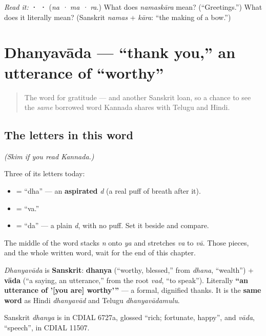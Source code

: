 \begin{tcolorbox}[breakable,colback=teal!4,colframe=teal!35!black,title={Before you move on}]
\emph{Read it:} \textbf{ ·  · } (\emph{na · ma · ra}.) What does \emph{namaskāra} mean? (“Greetings.”) What does it literally mean? (Sanskrit \emph{namas} + \emph{kāra}: “the making of a bow.”)
\end{tcolorbox}
\section[\texorpdfstring{\kn{ಧನ್ಯವಾದ} (dhanyavāda)}{ಧನ್ಯವಾದ (dhanyavāda)}]{Dhanyavāda — \textquotedblleft{}thank you,\textquotedblright{} an utterance of \textquotedblleft{}worthy\textquotedblright{}}

\label{lesson:KA-C01-dhanyavada}



\begin{quote}
The word for gratitude — and another Sanskrit loan, so a chance to see the \emph{same} borrowed word Kannada shares with Telugu and Hindi.
\end{quote}

\subsection*{The letters in this word}
\emph{(Skim if you read Kannada.)}

Three of its letters today:

\begin{itemize}
\raggedright
  \item \textbf{} = \textquotedblleft{}dha\textquotedblright{} — an \textbf{aspirated} \emph{d} (a real puff of breath after it).
  \item \textbf{} = \textquotedblleft{}va.\textquotedblright{}
  \item \textbf{} = \textquotedblleft{}da\textquotedblright{} — a plain \emph{d}, with no puff. Set it beside \textbf{} and compare.
\end{itemize}

The middle of the word stacks \emph{n} onto \emph{ya} and stretches \emph{va} to \emph{vā}. Those pieces, and the whole written word, wait for the end of this chapter.

\begin{cousinweb}
\emph{Dhanyavāda} is \textbf{Sanskrit}: \textbf{dhanya} (\textquotedblleft{}worthy, blessed,\textquotedblright{} from \emph{dhana}, \textquotedblleft{}wealth\textquotedblright{}) + \textbf{vāda} (\textquotedblleft{}a saying, an utterance,\textquotedblright{} from the root \emph{vad}, \textquotedblleft{}to speak\textquotedblright{}). Literally \textbf{\textquotedblleft{}an utterance of '{[}you are{]} worthy'\textquotedblright{}} — a formal, dignified thanks. It is the \textbf{same word} as Hindi \emph{dhanyavād} and Telugu \emph{dhanyavādamulu}.

Sanskrit \emph{dhanya} is in CDIAL 6727a, glossed \textquotedblleft{}rich; fortunate, happy\textquotedblright{}, and \emph{vāda}, \textquotedblleft{}speech\textquotedblright{}, in CDIAL 11507.
\end{cousinweb}

